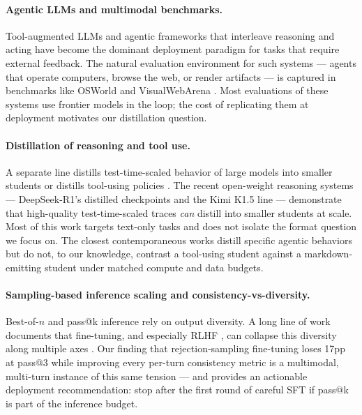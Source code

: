 \documentclass[11pt]{article}
\begin{document}
\paragraph{Agentic LLMs and multimodal benchmarks.} Tool-augmented LLMs \citep{schick2023toolformer,patil2024gorilla} and agentic frameworks that interleave reasoning and acting \citep{yao2023react,wang2023voyager} have become the dominant deployment paradigm for tasks that require external feedback. The natural evaluation environment for such systems --- agents that operate computers, browse the web, or render artifacts --- is captured in benchmarks like OSWorld \citep{xie2024osworld} and VisualWebArena \citep{koh2024visualwebarena}. Most evaluations of these systems use frontier models in the loop; the cost of replicating them at deployment motivates our distillation question.

\paragraph{Distillation of reasoning and tool use.} A separate line distills test-time-scaled behavior of large models into smaller students \citep{magister2023teaching,ho2023largelm,fu2023specializing} or distills tool-using policies \citep{schick2023toolformer,patil2024gorilla}. The recent open-weight reasoning systems --- DeepSeek-R1's distilled checkpoints \citep{deepseek2025r1} and the Kimi K1.5 line \citep{kimi2025k15} --- demonstrate that high-quality test-time-scaled traces \emph{can} distill into smaller students at scale. Most of this work targets text-only tasks and does not isolate the format question we focus on. The closest contemporaneous works distill specific agentic behaviors but do not, to our knowledge, contrast a tool-using student against a markdown-emitting student under matched compute and data budgets.

\paragraph{Sampling-based inference scaling and consistency-vs-diversity.} Best-of-$n$ and pass@k inference \citep{chen2021evaluating,brown2024large} rely on output diversity. A long line of work documents that fine-tuning, and especially RLHF \citep{stiennon2020learning,casper2023open}, can collapse this diversity along multiple axes \citep{kirk2024diversity,padmakumar2024writing}. Our finding that rejection-sampling fine-tuning loses 17pp at pass@3 while improving every per-turn consistency metric is a multimodal, multi-turn instance of this same tension --- and provides an actionable deployment recommendation: stop after the first round of careful SFT if pass@k is part of the inference budget.
\end{document}
